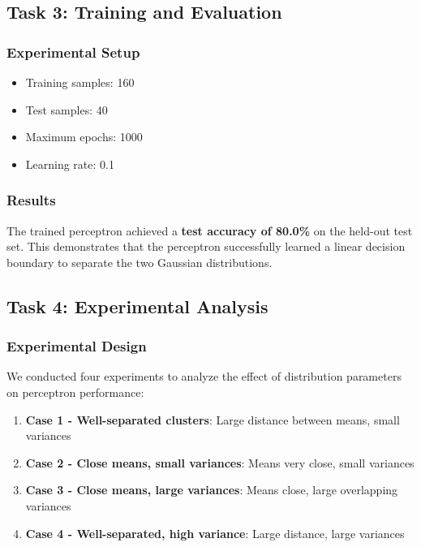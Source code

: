 \documentclass[11pt,a4paper]{article}
\begin{document}
\subsection{Task 3: Training and Evaluation}

\subsubsection{Experimental Setup}
\begin{itemize}
    \item Training samples: 160
    \item Test samples: 40
    \item Maximum epochs: 1000
    \item Learning rate: 0.1
\end{itemize}

\subsubsection{Results}
The trained perceptron achieved a \textbf{test accuracy of 80.0\%} on the held-out test set. This demonstrates that the perceptron successfully learned a linear decision boundary to separate the two Gaussian distributions.

\subsection{Task 4: Experimental Analysis}

\subsubsection{Experimental Design}
We conducted four experiments to analyze the effect of distribution parameters on perceptron performance:

\begin{enumerate}
    \item \textbf{Case 1 - Well-separated clusters}: Large distance between means, small variances
    \item \textbf{Case 2 - Close means, small variances}: Means very close, small variances
    \item \textbf{Case 3 - Close means, large variances}: Means close, large overlapping variances
    \item \textbf{Case 4 - Well-separated, high variance}: Large distance, large variances
\end{enumerate}
\end{document}
